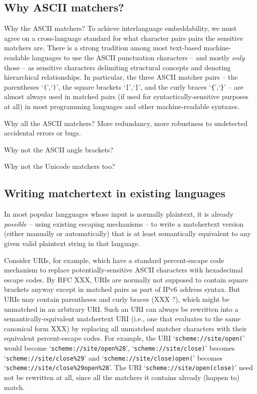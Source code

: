 \subsection{Why ASCII matchers?}
\label{sec:design:ascii}

Why the ASCII matchers?
To achieve interlanguage embeddability,
we must agree on a cross-language standard for what character pairs
pairs the sensitive matchers are.
There is a strong tradition among most text-based machine-readable languages
to use the ASCII punctuation characters -- and mostly \emph{only} those --
as sensitive characters delimiting structural concepts
and denoting hierarchical relationships.
In particular, the three ASCII matcher pairs --
the parentheses `\verb|(|',`\verb|)|',
the square brackets `\verb|[|',`\verb|]|',
and the curly braces `\verb|{|',`\verb|}|' --
are almost always used in matched pairs
(if used for syntactically-sensitive purposes at all)
in most programming languages and other machine-readable syntaxes.


Why all the ASCII matchers?  More redundancy, more robustness
to undetected accidental errors or bugs.

Why not the ASCII angle brackets?

Why not the Unicode matchers too?


\subsection{Writing matchertext in existing languages}

In most popular langguages whose input is normally plaintext,
it is already \emph{possible} -- using existing escaping mechanisms --
to write a matchertext version
(either manually or automatically)
that is at least semantically equivalent
to any given valid plaintext string in that language.

Consider URIs, for example,
which have a standard percent-escape code mechanism
to replace potentially-sensitive ASCII characters with hexadecimal escape codes.
By RFC XXX, URIs are normally not supposed to contain square brackets anyway
except in matched pairs as part of IPv6 address syntax.
But URIs may contain parentheses and curly braces (XXX ?),
which might be unmatched in an arbitrary URI.
Such an URI can always be rewritten
into a semantically-equivalent matchertext URI
(i.e., one that evaluates to the same canonical form XXX)
by replacing all unmatched matcher characters with their
equivalent percent-escape codes.
For example, the URI `\verb|scheme://site/open(|'
would become `\verb|scheme://site/open%28|',
`\verb|scheme://site/close)|'
becomes `\verb|scheme://site/close%29|'
and `\verb|scheme://site/close)open(|' becomes
`\verb|scheme://site/close%29open%28|'.
The URI `\verb|scheme://site/open(close)|'
need not be rewritten at all,
since all the matchers it contains already (happen to) match.

